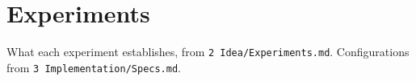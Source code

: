 \section{Experiments}
\label{sec:experiments}

What each experiment establishes, from \texttt{2 Idea/Experiments.md}. Configurations
from \texttt{3 Implementation/Specs.md}.
